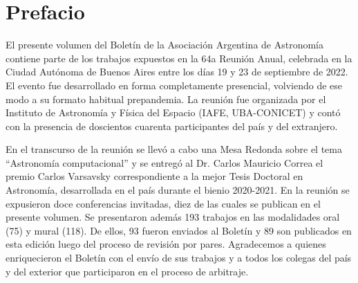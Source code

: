 \documentclass[
	a4paper,
  10pt,
  twoside,
  onesidepapers,
  electronic,
  binding=0mm,
  papers=final,
  paperselec=all,
	linkcolor=blue,
	colorheaders=black
]{confproc}
\author{\procpdfauthor}
\title{\procpdftitle}
\date{\today}
\begin{document}
\frontmatter
{}
\cfoot{\makebox[\textwidth][c]{\thepage}}
\setcounter{page}{-2}




\newpage \phantom{.} \newpage



\newpage \phantom{.} \newpage



\newpage \phantom{.} \newpage

\setcounter{page}{7}
\otherpagestyle

\setlength{\oddsidemargin}{-5mm}
\setlength{\evensidemargin}{-5mm}
\setlength{\textwidth}{10pt}

\section{Prefacio}


El presente volumen del Bolet\'in de la Asociaci\'on Argentina de Astronom\'ia contiene parte de los trabajos expuestos en la 64a Reuni\'on Anual, celebrada en la Ciudad Aut\'onoma de Buenos Aires entre los d\'ias 19 y 23 de septiembre de 2022. El evento fue desarrollado en forma completamente presencial, volviendo de ese modo a su formato habitual prepandemia. La reuni\'on fue organizada por el Instituto de Astronom\'ia y F\'isica del Espacio (IAFE, UBA-CONICET) y cont\'o con la presencia de doscientos cuarenta participantes del pa\'is y del extranjero.

En el transcurso de la reuni\'on se llev\'o a cabo una Mesa Redonda sobre el tema ``Astronom\'ia computacional'' y se entreg\'o al Dr. Carlos Mauricio Correa el premio Carlos Varsavsky correspondiente a la mejor Tesis Doctoral en Astronom\'ia, desarrollada en el pa\'is durante el bienio 2020-2021.
En la reuni\'on se expusieron doce conferencias invitadas, diez de las cuales se publican en el presente volumen. Se presentaron adem\'as 193 trabajos en las modalidades oral (75) y mural (118). De ellos, 93 fueron enviados al Bolet\'in y 89 son publicados en esta edici\'on luego del proceso de revisi\'on por pares. Agradecemos a quienes enriquecieron el Bolet\'in con el env\'io de sus trabajos y a todos los colegas del pa\'is y del exterior que participaron en el proceso de arbitraje.
\end{document}
